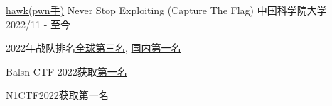 

\begin{cventries}

  \cventry
    {\href{https://nese.team/members/active/}{\textcolor{awesome-skyblue}{hawk}(pwn手)}} %
    {Never Stop Exploiting (Capture The Flag)} %
    {中国科学院大学} %
    {2022/11 - 至今} %
    {
      \begin{cvitems} %
        \item {2022年战队排名\href{https://ctftime.org/stats/2022}{\textcolor{awesome-skyblue}{全球第三名}}, \href{https://ctftime.org/stats/2022/CN}{\textcolor{awesome-skyblue}{国内第一名}}}
        \item {Balsn CTF 2022获取\href{https://ctftime.org/event/1697}{\textcolor{awesome-skyblue}{第一名}}}
        \item {N1CTF2022获取\href{https://ctftime.org/event/1759}{\textcolor{awesome-skyblue}{第一名}}}
      \end{cvitems}
    }

\end{cventries}
